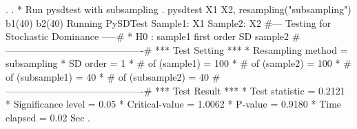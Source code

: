 . 
. * Run pysdtest with subsampling 
. pysdtest X1 X2, resampling("subsampling") b1(40) b2(40)
Running PySDTest
Sample1: X1
Sample2: X2
{\smallskip}
\#--- Testing for Stochastic Dominance  -----\#
{\smallskip}
* H0 : sample1 first order SD sample2
{\smallskip}
\#-------------------------------------------\#
{\smallskip}
*** Test Setting ***
* Resampling method      = subsampling
* SD order               =      1
* \# of (sample1)         =    100 
* \# of (sample2)         =    100
* \# of (subsample1)      =     40
* \# of (subsample2)      =     40
{\smallskip}
\#-------------------------------------------\#
{\smallskip}
*** Test Result ***
* Test statistic         = 0.2121
* Significance level     =  0.05
* Critical-value         = 1.0062
* P-value                = 0.9180
* Time elapsed           =  0.02 Sec
{\smallskip}
. 
